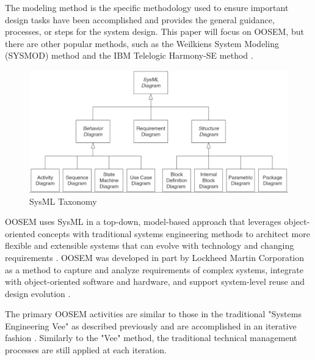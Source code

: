 The modeling method is the specific methodology used to ensure important design tasks have been accomplished and provides the general guidance, processes, or steps for the system design. This paper will focus on OOSEM, but there are other popular methods, such as the Weilkiens System Modeling (SYSMOD) method \citep{Weilkiens} and the IBM Telelogic Harmony-SE method \citep{IBM}.

\begin{figure}[H]
    \centering
    \includegraphics[width=5in]{Thesis/Literature_Review/Lit Review Figures/sysML taxonomy.png}
    \caption{SysML Taxonomy}
    \label{fig:SysML Taxonomy}
\end{figure}

OOSEM uses SysML in a top-down, model-based approach that leverages object-oriented concepts with traditional systems engineering methods to architect more flexible and extensible systems that can evolve with technology and changing requirements \citep{Estefan2008}. OOSEM was developed in part by Lockheed Martin Corporation as a method to capture and analyze requirements of complex systems, integrate with object-oriented software and hardware, and support system-level reuse and design evolution \citep{INCOSEhandbook}.

The primary OOSEM activities are similar to those in the traditional "Systems Engineering Vee" as described previously and are accomplished in an iterative fashion \citep{OMGwiki}. Similarly to the "Vee" method, the traditional technical management processes are still applied at each iteration.

